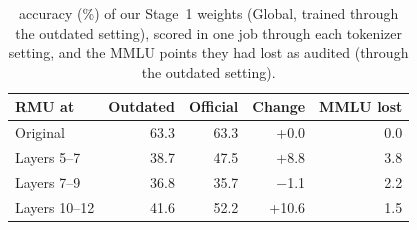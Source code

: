 \begin{table}[t]
\centering\small\setlength{\tabcolsep}{4pt}
\begin{tabular}{@{}lrrrr@{}}
\toprule
RMU at & Outdated & Official & Change & MMLU lost \\
\midrule
Original & 63.3 & 63.3 & +0.0 & 0.0 \\
Layers 5--7 & 38.7 & 47.5 & +8.8 & 3.8 \\
Layers 7--9 & 36.8 & 35.7 & $-$1.1 & 2.2 \\
Layers 10--12 & 41.6 & 52.2 & +10.6 & 1.5 \\
\bottomrule
\end{tabular}
\caption{\wmdp{} accuracy (\%) of our Stage~1 weights (Global, trained through the outdated setting), scored in one job through each tokenizer setting, and the MMLU points they had lost as audited (through the outdated setting).}
\label{tab:control}
\end{table}
